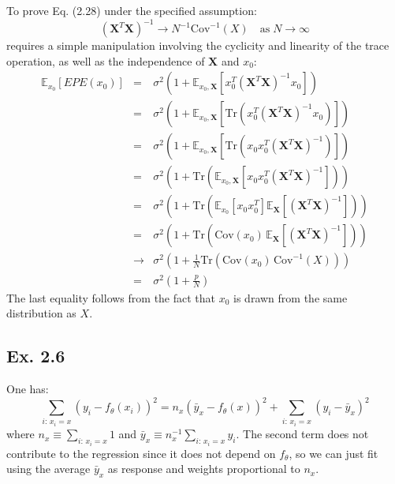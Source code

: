 To prove Eq. (2.28) under the specified assumption:
$$
(\mathbf{X}^T \mathbf{X})^{-1} \rightarrow N^{-1} \textrm{Cov}^{-1}(X) \quad \textrm{as} \; N \rightarrow \infty
$$
requires a simple manipulation involving the cyclicity and linearity of the trace operation, as well as the independence of $\mathbf{X}$ and $x_0$:
\begin{eqnarray*}
\mathbb{E}_{x_0} \left[EPE(x_0) \right] & = &\sigma^2 \left(1 + \mathbb{E}_{x_0, 
    \mathbf{X}} \left[x_0^T (\mathbf{X}^T \mathbf{X})^{-1} x_0\right] \right) \\
& = &\sigma^2 \left(1 + \mathbb{E}_{x_0, \mathbf{X}} \left[\textrm{Tr}\left(x_0^T 
    (\mathbf{X}^T \mathbf{X})^{-1} x_0 \right)\right] \right) \\
& = &\sigma^2 \left(1 + \mathbb{E}_{x_0, \mathbf{X}} \left[\textrm{Tr}\left(x_0 x_0^T 
    (\mathbf{X}^T \mathbf{X})^{-1} \right)\right] \right)\\
& = &\sigma^2 \left(1 + \textrm{Tr}\left(\mathbb{E}_{x_0, \mathbf{X}} \left[x_0 x_0^T 
    (\mathbf{X}^T \mathbf{X})^{-1} \right]\right) \right)\\
& = &\sigma^2 \left(1 + \textrm{Tr}\left(\mathbb{E}_{x_0} \left[x_0 x_0^T \right] 
    \mathbb{E}_{\mathbf{X}}\left[ (\mathbf{X}^T \mathbf{X})^{-1} \right]\right) \right)\\
& = &\sigma^2 \left(1 + \textrm{Tr}\left(\textrm{Cov}(x_0)\, 
    \mathbb{E}_{\mathbf{X}}\left[ (\mathbf{X}^T \mathbf{X})^{-1} \right]\right) \right)\\
& \rightarrow &\sigma^2 \left(1 + \frac{1}{N} \textrm{Tr}\left(\textrm{Cov}(x_0)\, 
    \textrm{Cov}^{-1}(X)\right) \right)\\
& = & \sigma^2 \left(1 + \frac{p}{N} \right)
\end{eqnarray*}
The last equality follows from the fact that $x_0$ is drawn from the same distribution 
as $X$. 


\subsection*{Ex. 2.6}

One has:
$$
\sum_{i:\, x_i = x} \left(y_i - f_\theta(x_i) \right)^2 = n_x \left(\bar{y}_x - 
	f_\theta(x)\right)^2 + \sum_{i:\, x_i = x} \left(y_i - \bar{y}_x \right)^2
$$
where $n_x \equiv \sum_{i:\, x_i = x} 1$ and $\bar{y}_x \equiv n_x^{-1} \sum_{i:\, x_i = 
x} y_i$. The second term does not contribute to the regression since it does not depend 
on $f_\theta$, so we can just fit using the average $\bar{y}_x$ as response and weights 
proportional to $n_x$.

